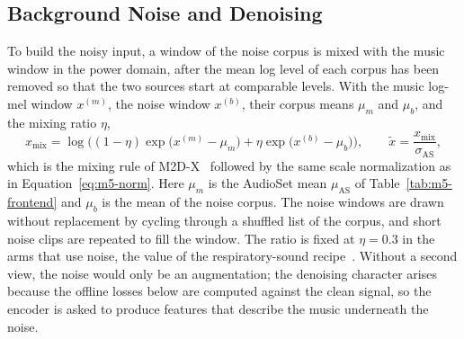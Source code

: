 \documentclass{FastFyp}
\begin{document}
\subsection{Background Noise and Denoising}
To build the noisy input, a window of the noise corpus is mixed with the music window in the power domain, after the mean log level of each corpus has been removed so that the two sources start at comparable levels. With the music log-mel window $x^{(m)}$, the noise window $x^{(b)}$, their corpus means $\mu_m$ and $\mu_b$, and the mixing ratio $\eta$,
\begin{equation}
x_{\mathrm{mix}}=\log\Big((1-\eta)\exp\big(x^{(m)}-\mu_m\big)+\eta\exp\big(x^{(b)}-\mu_b\big)\Big),\qquad
\tilde{x}=\frac{x_{\mathrm{mix}}}{\sigma_{\mathrm{AS}}},
\label{eq:m5-mix}
\end{equation}
which is the mixing rule of M2D-X~\cite{ref:Niizumi:2024m2dx} followed by the same scale normalization as in Equation~\ref{eq:m5-norm}. Here $\mu_m$ is the AudioSet mean $\mu_{\mathrm{AS}}$ of Table~\ref{tab:m5-frontend} and $\mu_b$ is the mean of the noise corpus. The noise windows are drawn without replacement by cycling through a shuffled list of the corpus, and short noise clips are repeated to fill the window. The ratio is fixed at $\eta=0.3$ in the arms that use noise, the value of the respiratory-sound recipe~\cite{ref:Niizumi:2024m2dx}. Without a second view, the noise would only be an augmentation; the denoising character arises because the offline losses below are computed against the clean signal, so the encoder is asked to produce features that describe the music underneath the noise.
\end{document}
